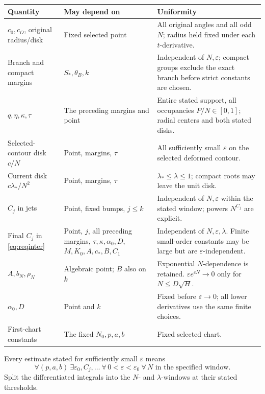 \documentclass[11pt]{article}
\numberwithin{equation}{section}
\theoremstyle{definition}
\newcommand{\eps}{\varepsilon}
\begin{document}
\begin{longtable}{>{\raggedright\arraybackslash}p{}>{\raggedright\arraybackslash}p{}>{\raggedright\arraybackslash}p{}}
\toprule
Quantity & May depend on & Uniformity\\
\midrule
\endhead
\(c_0,c_O\), original radius/disk &
Fixed selected point & All original angles and all odd \(N\);
radius held fixed under each \(t\)-derivative.\\
Branch and compact margins &
\(S_*,\theta_B,k\) & Independent of \(N,\eps\); compact groups
exclude the exact branch before strict constants are chosen.\\
\(q,\eta,\kappa,\tau\) &
The preceding margins and point & Entire stated support, all
occupancies \(P/N\in[0,1]\); radial centers and both stated disks.\\
Selected-contour disk \(c/N\) &
Point, margins, \(\tau\) & All sufficiently small \(\eps\) on
the selected deformed contour.\\
Current disk \(c\lambda_*/N^2\) &
Point, margins, \(\tau\) & \(\lambda_*\le\lambda\le1\);
compact roots may leave the unit disk.\\
\(C_j\) in jets &
Point, fixed bumps, \(j\le k\) & Independent of \(N,\eps\) within
the stated window; powers \(N^{C_j}\) are explicit.\\
Final \(C_j\) in \eqref{eq:reqinter} &
Point, \(j\), all preceding margins, \(\tau,\kappa,\alpha_0,D\),
\(M,K_0,A,c_*,B,C_1\) & Independent of \(N,\eps,\lambda\).
Finite small-order constants may be large but are
\(\eps\)-independent.\\
\(A,b_N,\rho_N\) &
Algebraic point; \(B\) also on \(k\) & Exponential \(N\)-dependence
is retained. \(\eps e^{cN}\to0\) only for \(N\le D\sqrt H\).\\
\(\alpha_0,D\) &
Point and \(k\) & Fixed before \(\eps\to0\); all lower derivatives
use the same finite choices.\\
First-chart constants &
The fixed \(N_0,p,a,b\) & Fixed selected chart.\\
\bottomrule
\end{longtable}

Every estimate stated for sufficiently small \(\eps\) means
\[
 \forall(p,a,b)\ \exists\eps_0,C_j,\ldots\
 \forall\,0<\eps<\eps_0\
 \forall\,N\text{ in the specified window}.
\]
Split the differentiated integrals into the \(N\)- and
\(\lambda\)-windows at their stated thresholds.
\end{document}
